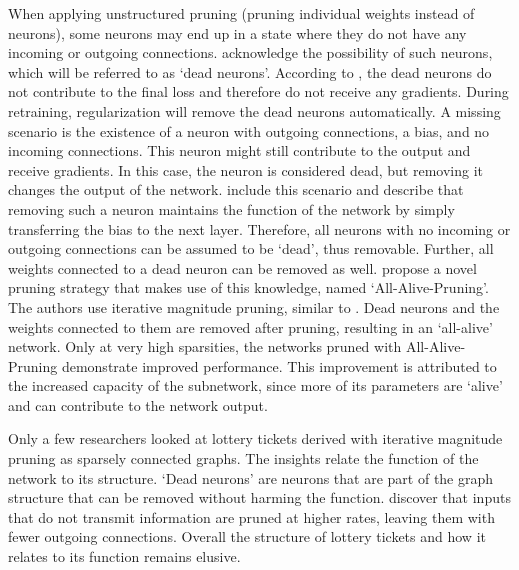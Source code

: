 When applying unstructured pruning (pruning individual weights instead of neurons), some neurons may end up in a state where they do not have any incoming or outgoing connections. 
\textcite{HanEtAl15} acknowledge the possibility of such neurons, which will be referred to as `dead neurons'. 
According to \autocite{HanEtAl15}, the dead neurons do not contribute to the final loss and therefore do not receive any gradients. 
During retraining, regularization will remove the dead neurons automatically. 
A missing scenario is the existence of a neuron with outgoing connections, a bias, and no incoming connections. This neuron might still contribute to the output and receive gradients. 
In this case, the neuron is considered dead, but removing it changes the output of the network.
\textcite{AllAlivePruning} include this scenario and describe that removing such a neuron maintains the function of the network by simply transferring the bias to the next layer. 
Therefore, all neurons with no incoming or outgoing connections can be assumed to be `dead', thus removable. 
Further, all weights connected to a dead neuron can be removed as well.
\textcite{AllAlivePruning} propose a novel pruning strategy that makes use of this knowledge, named `All-Alive-Pruning'. 
The authors use iterative magnitude pruning, similar to \autocite{LTH}.
Dead neurons and the weights connected to them are removed after pruning, resulting in an `all-alive' network.
Only at very high sparsities, the networks pruned with All-Alive-Pruning demonstrate improved performance. 
This improvement is attributed to the increased capacity of the subnetwork, since more of its parameters are `alive' and can contribute to the network output.

Only a few researchers looked at lottery tickets derived with iterative magnitude pruning as sparsely connected graphs. 
The insights relate the function of the network to its structure.
`Dead neurons' \autocite{HanEtAl15, AllAlivePruning} are neurons that are part of the graph structure that can be removed without harming the function.
\textcite{LTH} discover that inputs that do not transmit information are pruned at higher rates, leaving them with fewer outgoing connections.
Overall the structure of lottery tickets and how it relates to its function remains elusive.

